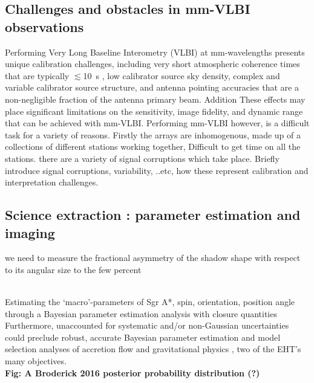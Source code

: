 \subsection{Challenges and obstacles in mm-VLBI observations}
Performing Very Long Baseline Interometry (VLBI) at mm-wavelengths presents unique calibration challenges, including very short atmospheric coherence times that are typically $\lesssim$10~s \citep{Doeleman_2009}, low calibrator source sky density, complex and variable calibrator source structure, and antenna pointing accuracies that are a non-negligible fraction of the antenna primary beam. Addition These effects may place significant limitations on the sensitivity, image fidelity, and dynamic range that can be achieved with mm-VLBI.  Performing mm-VLBI however, is a difficult task for a variety of reasons. Firstly the arrays are inhomogenous, made up of a collections of different stations working together, Difficult to get time on all the stations. there are a variety of signal corruptions which take place. Briefly introduce signal corruptions, variability, ..etc, how these represent calibration and interpretation challenges.


\subsection{Science extraction : parameter estimation and imaging}

we need to measure the fractional
asymmetry of the shadow shape with respect to its angular size to the few percent


~\\
Estimating the `macro'-parameters of Sgr A*, spin, orientation, position angle through a Bayesian parameter estimation analysis with closure quantities\\
Furthermore, unaccounted for systematic and/or non-Gaussian uncertainties could preclude robust, accurate Bayesian parameter estimation and model selection analyses of accretion flow \citep[e.g.][]{Broderick_2016} and gravitational physics \citep[e.g.][]{Broderick_2014, Psaltis_2016}, two of the EHT's many objectives.
~\\
\textbf{Fig: A Broderick 2016 posterior probability distribution (?)}

